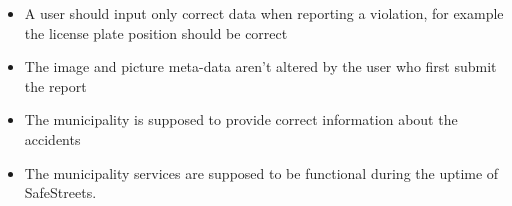 \begin{itemize}

\item A user should input only correct data when reporting a violation, for example the license plate position should be correct

\item The image and picture meta-data aren't altered by the user who first submit the report

\item The municipality is supposed to provide correct information 
about the accidents

\item The municipality services are supposed to be functional during the uptime of SafeStreets.

\end{itemize}